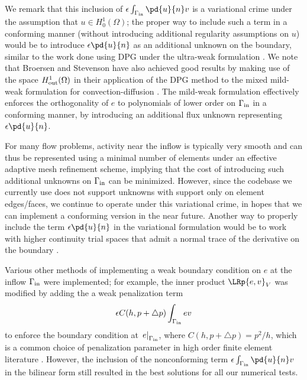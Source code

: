 \begin{remark}
We remark that this inclusion of $\epsilon\int_{\Gamma_{\rm in}} \pd{u}{n}v$ is a variational crime under the assumption that $u \in H^1_0(\Omega)$; the proper way to include such a term in a conforming manner (without introducing additional regularity assumptions on $u$) would be to introduce $\epsilon \pd{u}{n}$ as an additional unknown on the boundary, similar to the work done using DPG under the ultra-weak formulation \cite{DPG2,analysisDPG}.  We note that Broersen and Stevenson have also achieved good results by making use of the space $H^1_{\rm out}(\Omega)$ in their application of the DPG method to the mixed mild-weak formulation for convection-diffusion \cite{broersenStevenson}.  The mild-weak formulation effectively enforces the orthogonality of $e$ to polynomials of lower order on $\Gamma_{\rm in}$ in a conforming manner, by introducing an additional flux unknown representing $\epsilon \pd{u}{n}$.  

For many flow problems, activity near the inflow is typically very smooth and can thus be represented using a minimal number of elements under an effective adaptive mesh refinement scheme, implying that the cost of introducing such additional unknowns on $\Gamma_{\rm in}$ can be minimized.  However, since the codebase we currently use does not support unknowns with support only on element edges/faces, we continue to operate under this variational crime, in hopes that we can implement a conforming version in the near future.  Another way to properly include the term $\epsilon \pd{u}{n}$ in the variational formulation would be to work with higher continuity trial spaces that admit a normal trace of the derivative on the boundary \cite{nurbsTrace, NURBSorig}.  
\end{remark}
\begin{remark}
Various other methods of implementing a weak boundary condition on $e$ at the inflow $\Gamma_{\rm in}$ were implemented; for example, the inner product $\LRp{e,v}_V$ was modified by adding the a weak penalization term $$\epsilon C(h,p+\triangle p)\int_{\Gamma_{\rm in}}ev $$ to enforce the boundary condition at $\left.e\right |_{\Gamma_{\rm in}}$, where $C(h,p+\triangle p) = p^2/h$, which is a common choice of penalization parameter in high order finite element literature \cite{nurbsTrace,Warburton20032765}. However, the inclusion of the nonconforming term $\epsilon\int_{\Gamma_{\rm in}} \pd{u}{n}v$ in the bilinear form still resulted in the best solutions for all our numerical tests.  
\end{remark}

